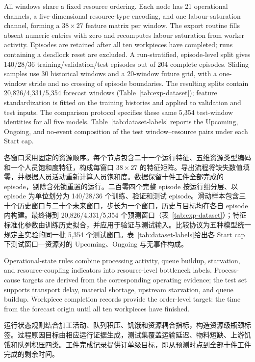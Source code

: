 \documentclass[a4paper,fleqn]{cas-dc}
\newcommand{\zhpara}[1]{%
  \par\begingroup\small\color{black!72}\noindent #1\par\endgroup}
\begin{document}
All windows share a fixed resource ordering. Each node has 21 operational channels, a five-dimensional resource-type encoding, and one labour-saturation channel, forming a $38\times27$ feature matrix per window. The export routine fills absent numeric entries with zero and recomputes labour saturation from worker activity. Episodes are retained after all ten workpieces have completed; runs containing a deadlock reset are excluded. A run-stratified, episode-level split gives 140/28/36 training/validation/test episodes out of 204 complete episodes. Sliding samples use 30 historical windows and a 20-window future grid, with a one-window stride and no crossing of episode boundaries. The resulting splits contain 20,826/4,331/5,354 forecast windows (Table~\ref{tab:exp-dataset}); feature standardization is fitted on the training histories and applied to validation and test inputs. The comparison protocol specifies these same 5,354 test-window identities for all five models. Table~\ref{tab:dataset-labels} reports the Upcoming, Ongoing, and no-event composition of the test window--resource pairs under each Start cap.

\zhpara{各窗口采用固定的资源顺序。每个节点包含二十一个运行特征、五维资源类型编码和一个人员饱和度特征，构成每窗口 $38\times27$ 的特征矩阵。导出流程将缺失数值填零，并根据人员活动重新计算人员饱和度。数据保留十件工件全部完成的 episode，剔除含死锁重置的运行。二百零四个完整 episode 按运行组分层、以 episode 为单位划分为 140/28/36 个训练、验证和测试 episode。滑动样本包含三十个历史窗口与二十个未来窗口，步长为一个窗口，历史与目标均在各自 episode 内构建。最终得到 20,826/4,331/5,354 个预测窗口（表~\ref{tab:exp-dataset}）；特征标准化参数由训练历史拟合，并应用于验证与测试输入。比较协议为五种模型统一规定主实验的同一批 5,354 个测试窗口。表~\ref{tab:dataset-labels}给出各 Start cap 下测试窗口—资源对的 Upcoming、Ongoing 与无事件构成。}

Operational-state rules combine processing activity, queue buildup, starvation, and resource-coupling indicators into resource-level bottleneck labels. Process-cause targets are derived from the corresponding operating evidence; the test set supports transport delay, material shortage, upstream starvation, and queue buildup. Workpiece completion records provide the order-level target: the time from the forecast origin until all ten workpieces have finished.

\zhpara{运行状态规则结合加工活动、队列积压、饥饿和资源耦合指标，构造资源级瓶颈标签。过程原因目标由相应运行证据生成，测试集覆盖运输延迟、物料短缺、上游饥饿和队列积压四类。工件完成记录提供订单级目标，即从预测时点到全部十件工件完成的剩余时间。}
\end{document}
